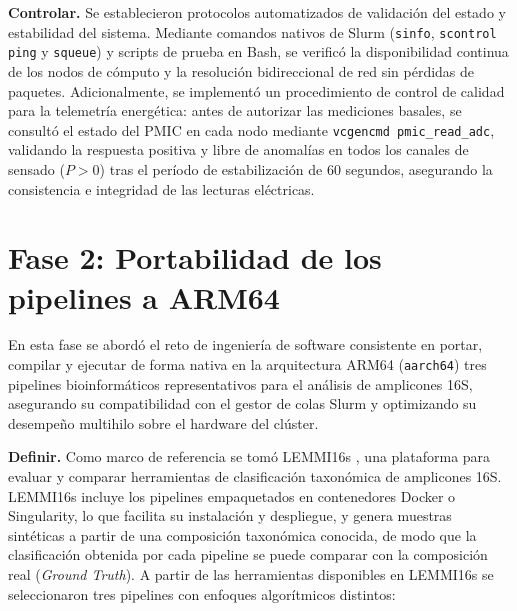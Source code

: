 \documentclass[12pt,oneside,spanish]{book}
\begin{document}
    \textbf{Controlar.} Se establecieron protocolos automatizados de validación del estado y estabilidad del sistema. Mediante comandos nativos de Slurm (\texttt{sinfo}, \texttt{scontrol ping} y \texttt{squeue}) y scripts de prueba en Bash, se verificó la disponibilidad continua de los nodos de cómputo y la resolución bidireccional de red sin pérdidas de paquetes. Adicionalmente, se implementó un procedimiento de control de calidad para la telemetría energética: antes de autorizar las mediciones basales, se consultó el estado del PMIC en cada nodo mediante \texttt{vcgencmd pmic\_read\_adc}, validando la respuesta positiva y libre de anomalías en todos los canales de sensado ($P > 0$) tras el período de estabilización de 60 segundos, asegurando la consistencia e integridad de las lecturas eléctricas.

    
    \section{Fase 2: Portabilidad de los pipelines a ARM64}
    \label{sec:fase2_metodologia}
    
    En esta fase se abordó el reto de ingeniería de software consistente en portar, compilar y ejecutar de forma nativa en la arquitectura ARM64 (\texttt{aarch64}) tres pipelines bioinformáticos representativos para el análisis de amplicones 16S, asegurando su compatibilidad con el gestor de colas Slurm y optimizando su desempeño multihilo sobre el hardware del clúster.
    
    \textbf{Definir.} Como marco de referencia se tomó LEMMI16s \citep{seppey2025lemmi}, una plataforma para evaluar y comparar herramientas de clasificación taxonómica de amplicones 16S. LEMMI16s incluye los pipelines empaquetados en contenedores Docker o Singularity, lo que facilita su instalación y despliegue, y genera muestras sintéticas a partir de una composición taxonómica conocida, de modo que la clasificación obtenida por cada pipeline se puede comparar con la composición real (\textit{Ground Truth}). A partir de las herramientas disponibles en LEMMI16s se seleccionaron tres pipelines con enfoques algorítmicos distintos:
    
\end{document}
